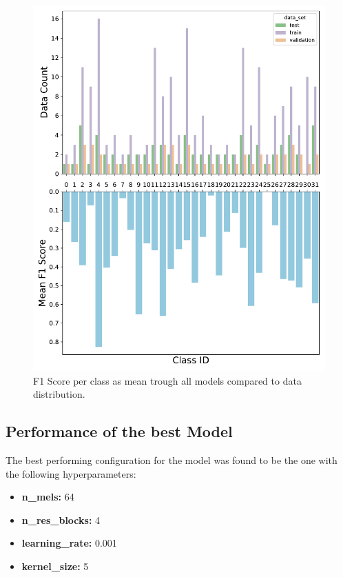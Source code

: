 \begin{figure}[h!]
    \centering
    \captionsetup{width=.7\linewidth}
    \includegraphics[width=1\textwidth]{figures/f1_per_class.pdf}
    \caption{F1 Score per class as mean trough all models compared to data distribution.}
    \label{fig:f1_per_class}
\end{figure}



\subsection{Performance of the best Model}

The best performing configuration for the model was found to be the one with the following hyperparameters:

\begin{itemize}
    \item \textbf{n\_mels:} 64
    \item \textbf{n\_res\_blocks:} 4
    \item \textbf{learning\_rate:} 0.001
    \item \textbf{kernel\_size:} 5
\end{itemize}

